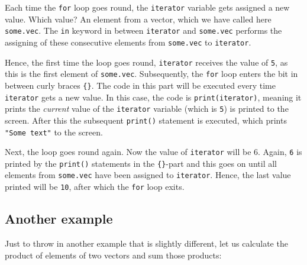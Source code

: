 \documentclass[
]{book}
\begin{document}
Each time the \texttt{for} loop goes round, the \texttt{iterator} variable gets assigned a new value. Which value? An element from a vector, which we have called here \texttt{some.vec}. The \texttt{in} keyword in between \texttt{iterator} and \texttt{some.vec} performs the assigning of these consecutive elements from \texttt{some.vec} to \texttt{iterator}.

Hence, the first time the loop goes round, \texttt{iterator} receives the value of \texttt{5}, as this is the first element of \texttt{some.vec}. Subsequently, the \texttt{for} loop enters the bit in between curly braces \texttt{\{\}}. The code in this part will be executed every time \texttt{iterator} gets a new value. In this case, the code is \texttt{print(iterator)}, meaning it prints the \emph{current} value of the \texttt{iterator} variable (which is \texttt{5}) is printed to the screen. After this the subsequent \texttt{print()} statement is executed, which prints \texttt{"Some\ text"} to the screen.

Next, the loop goes round again. Now the value of \texttt{iterator} will be 6. Again, \texttt{6} is printed by the \texttt{print()} statements in the \texttt{\{\}}-part and this goes on until all elements from \texttt{some.vec} have been assigned to \texttt{iterator}. Hence, the last value printed will be \texttt{10}, after which the \texttt{for} loop exits.

\hypertarget{another-example}{%
\subsection{Another example}\label{another-example}}

Just to throw in another example that is slightly different, let us calculate the product of elements of two vectors and sum those products:
\end{document}
